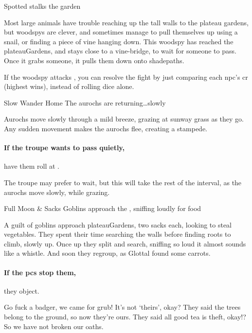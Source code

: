{ Spotted}%
{ stalks the garden}%

Most large animals have trouble reaching up the tall walls to the plateau gardens, but \glspl{woodspy} are clever, and sometimes manage to pull themselves up using a snail, or finding a piece of vine hanging down.
This \gls{woodspy} has reached the \gls{plateauGardens}, and stays close to a vine-bridge, to wait for someone to pass.
Once it grabs someone, it pulls them down onto \gls{shadepaths}.

If the \gls{woodspy} attacks , you can resolve the fight by just comparing each \gls{npc}'s \gls{cr} (highest wins), instead of rolling dice alone.

{Slow Wander Home}%
{The aurochs are returning\ldots slowly}%

Aurochs move slowly through a mild breeze, grazing at \gls{sunway} grass as they go.
Any sudden movement makes the aurochs flee, creating a stampede.

\paragraph{If the troupe wants to pass quietly,}
have them roll  at \tn[8].

The troupe may prefer to wait, but this will take the rest of the \gls{interval}, as the aurochs move slowly, while grazing.

{Full Moon \& Sacks}%
{Goblins approach the , sniffing loudly for food}%

A guilt of goblins approach \gls{plateauGardens}, two sacks each, looking to steal vegetables.
They spent their time searching the walls before finding roots to climb, slowly up.
Once up they split and search, sniffing so loud it almost sounds like a whistle.
And soon they regroup, as Glottal found some carrots.

\paragraph{If the \glspl{pc} stop them,}
they object.

\begin{speechtext}
  Go fuck a badger, we came for grub!
  It's not `theirs', okay?
  They said the trees belong to the ground, so now they're ours.
  They said all good tea is theft, okay!?
  So we have not broken our oaths.
\end{speechtext}

